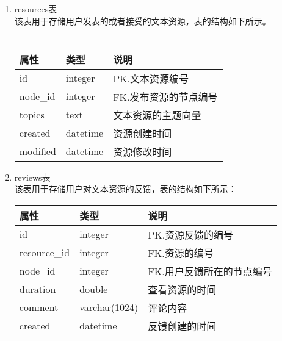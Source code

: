 \begin{enumerate}
\item resources表 \\
该表用于存储用户发表的或者接受的文本资源，表的结构如下所示。
\\ \\
\begin{table}[!htb]
  \centering
  \begin{tabular}{|l|l|l|}
    \hline
    属性 & 类型 & 说明 \\
    \hline
    id & integer & PK.文本资源编号 \\
    \hline
    node\_id & integer & FK.发布资源的节点编号 \\
    \hline
    topics & text & 文本资源的主题向量 \\
    \hline
    created & datetime & 资源创建时间 \\
    \hline
    modified & datetime & 资源修改时间 \\
    \hline
  \end{tabular}
\end{table}
\item reviews表 \\
该表用于存储用户对文本资源的反馈，表的结构如下所示：
\begin{table}[!htb]
  \centering
  \begin{tabular}{|l|l|l|}
    \hline
    属性 & 类型 & 说明 \\
    \hline
    id & integer & PK.资源反馈的编号 \\
    \hline
    resource\_id & integer & FK.资源的编号 \\
    \hline
    node\_id & integer & FK.用户反馈所在的节点编号 \\
    \hline
    duration & double & 查看资源的时间 \\
    \hline
    comment & varchar(1024) & 评论内容 \\
    \hline
    created & datetime & 反馈创建的时间 \\
    \hline
  \end{tabular}
\end{table}
\end{enumerate}

